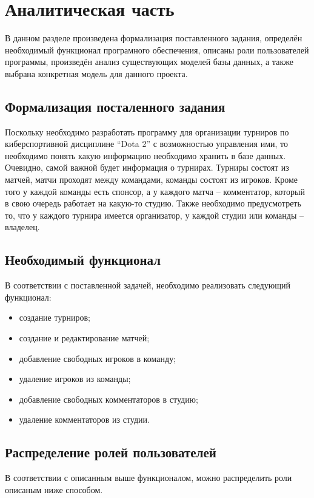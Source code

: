 \chapter{Аналитическая часть}
\label{cha:analysis}

В данном разделе произведена формализация поставленного задания, определён необходимый функционал програмного обеспечения, описаны роли пользователей программы, произведён анализ существующих моделей базы данных, а также выбрана конкретная модель для данного проекта.

\section{Формализация посталенного задания}
Поскольку необходимо разработать программу для организации турниров по киберспортивной дисциплине “Dota 2” с возможностью управления ими, то необходимо понять какую информацию необходимо хранить в базе данных. Очевидно, самой важной будет информация о турнирах. Турниры состоят из матчей, матчи проходят между командами, команды состоят из игроков. Кроме того у каждой команды есть спонсор, а у каждого матча -- комментатор, который в свою очередь работает на какую-то студию. Также необходимо предусмотреть то, что у каждого турнира имеется организатор, у каждой студии или команды -- владелец.

\section{Необходимый функционал}
В соответствии с поставленной задачей, необходимо реализовать следующий функционал:
\begin{itemize}
	\item создание турниров;
	\item создание и редактирование матчей;
	\item добавление свободных игроков в команду;
	\item удаление игроков из команды;
	\item добавление свободных комментаторов в студию;
	\item удаление комментаторов из студии.
\end{itemize}

\section{Распределение ролей пользователей}
В соответствии с описанным выше функционалом, можно распределить роли описаным ниже способом.

